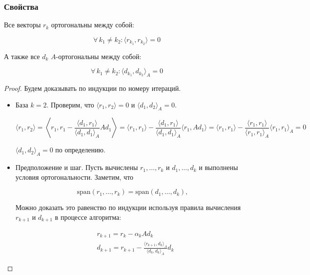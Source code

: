\subsubsection*{Свойства}

\begin{claim}
    Все векторы $r_k$ ортогональны между собой:

    \[
    \forall \, k_1 \neq k_2: \langle r_{k_1}, r_{k_2} \rangle = 0
    \]

    А также все $d_k$ $A$-ортогональны между собой:

    \[
    \forall \, k_1 \neq k_2: \langle d_{k_1}, d_{k_2} \rangle_A = 0
    \]
\end{claim}

\begin{proof}
    Будем доказывать по индукции по номеру итераций.

    \begin{itemize}
        \item База $k = 2$. Проверим, что $\langle r_1, r_2 \rangle = 0$ и $\langle d_1, d_2 \rangle_A = 0$.

        \[
        \langle r_1, r_2 \rangle = \left\langle r_1,
        r_1 - \frac{\langle d_1, r_1 \rangle}{\langle d_1, d_1 \rangle_A} A d_1
        \right\rangle =
        \langle r_1, r_1 \rangle - \frac{\langle d_1, r_1 \rangle}{\langle d_1, d_1 \rangle_A} \langle r_1, A d_1 \rangle =
        \langle r_1, r_1 \rangle - \frac{\langle r_1, r_1 \rangle}{\langle r_1, r_1 \rangle_A} \langle r_1, r_1 \rangle_A = 0
        \]

        $\langle d_1, d_2 \rangle_A = 0$ по определению.

        \item Предположение и шаг. Пусть вычислены $r_1, \ldots, r_k$ и $d_1, \ldots, d_k$ и выполнены условия ортогональности. Заметим, что

        \[
        \mathrm{span}(r_1, \ldots, r_k) = \mathrm{span}(d_1, \ldots, d_k),
        \]

        Можно доказать это равенство по индукции используя правила вычисления $r_{k+1}$ и $d_{k+1}$ в процессе алгоритма:

        \begin{equation*}
            \begin{aligned}
                &r_{k+1} = r_k - \alpha_k A d_k\\
                &d_{k+1} =  r_{k+1} - \frac{\langle r_{k+1}, d_k \rangle_A}{\langle d_k, d_k \rangle_A} d_k
           \end{aligned}
        \end{equation*}


\end{itemize}
\end{proof}
